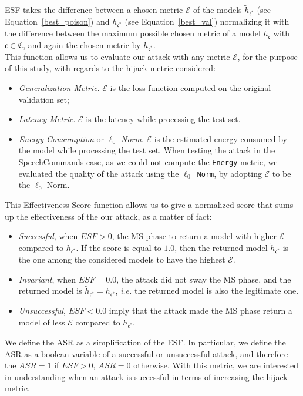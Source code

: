 ESF takes the difference between a chosen metric $\mathcal{E}$ of the models $\tilde{h}_{\mathfrak{c}^*}$ (see Equation~\ref{best_poison}) and $h_{\mathfrak{c}^*}$ (see Equation~\ref{best_val}) normalizing it with the difference between the maximum possible chosen metric of a model $h_\mathfrak{c}$ with $\mathfrak{c} \in \mathfrak{C}$, and again the chosen metric by $h_{\mathfrak{c}^*}$.\\
This function allows us to evaluate our attack with any metric $\mathcal{E}$, for the purpose of this study, with regards to the hijack metric considered:
\begin{itemize}
    \item \textit{Generalization Metric}. $\mathcal{E}$ is the loss function computed on the original validation set;
    \item \textit{Latency Metric}. $\mathcal{E}$ is the latency while processing the test set.
    \item \textit{Energy Consumption} or \textit{$\ell_0$ Norm}. $\mathcal{E}$ is the estimated energy consumed by the model while processing the test set. When testing the attack in the SpeechCommands case, as we could not compute the \texttt{Energy} metric, we evaluated the quality of the attack using the \texttt{$\ell_0$ Norm}, by adopting $\mathcal{E}$ to be the $\ell_0$ Norm.
\end{itemize}
This Effectiveness Score function allows us to give a normalized score that sums up the effectiveness of the our attack, as a matter of fact:
\begin{itemize}
    \item \textit{Successful}, when $ESF > 0$, the MS phase to return a model with higher $\mathcal{E}$ compared to $h_{\mathfrak{c}^*}$. If the score is equal to $1.0$, then the returned model $\tilde{h}_{\mathfrak{c}^*}$ is the one among the considered models to have the highest $\mathcal{E}$.
    \item \textit{Invariant}, when $ESF = 0.0$, the attack did not sway the MS phase, and the returned model is $\tilde{h}_{\mathfrak{c}^*} = h_{\mathfrak{c}^*}$, \textit{i.e.} the returned model is also the legitimate one. 
    \item \textit{Unsuccessful}, $ESF < 0.0$ imply that the attack made the MS phase return a model of less $\mathcal{E}$ compared to $h_{\mathfrak{c}^*}$.
\end{itemize}  
\par
We define the ASR as a simplification of the ESF. In particular, we define the ASR as a boolean variable of a successful or unsuccessful attack, and therefore the $ASR = 1$ if $ESF > 0$, $ASR = 0$ otherwise. 
With this metric, we are interested in understanding when an attack is successful in terms of increasing the hijack metric. 



